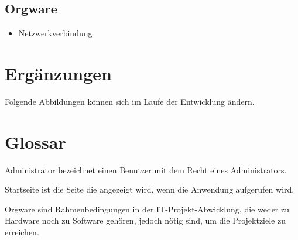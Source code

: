 \documentclass[a4paper,oneside]{scrreprt}
\begin{document}
\section{Orgware}

\begin{itemize}
\item Netzwerkverbindung
\end{itemize}

\chapter{Ergänzungen}

Folgende Abbildungen können sich im Laufe der Entwicklung ändern.


\chapter{Glossar}

Administrator bezeichnet einen Benutzer mit dem Recht eines Administrators.

Startseite ist die Seite die angezeigt wird, wenn die Anwendung aufgerufen wird.

Orgware sind Rahmenbedingungen in der IT-Projekt-Abwicklung, die weder zu Hardware noch zu Software gehören, jedoch nötig sind, um die Projektziele zu erreichen.
\end{document}

